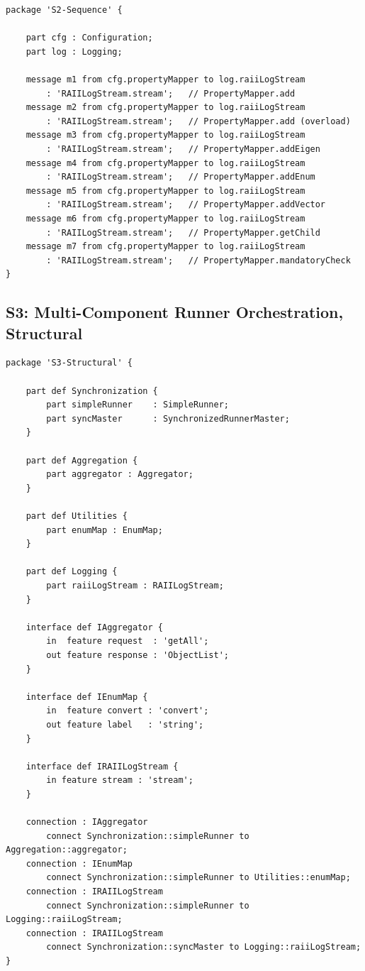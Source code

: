 \begin{verbatim}
package 'S2-Sequence' {

    part cfg : Configuration;
    part log : Logging;

    message m1 from cfg.propertyMapper to log.raiiLogStream
        : 'RAIILogStream.stream';   // PropertyMapper.add
    message m2 from cfg.propertyMapper to log.raiiLogStream
        : 'RAIILogStream.stream';   // PropertyMapper.add (overload)
    message m3 from cfg.propertyMapper to log.raiiLogStream
        : 'RAIILogStream.stream';   // PropertyMapper.addEigen
    message m4 from cfg.propertyMapper to log.raiiLogStream
        : 'RAIILogStream.stream';   // PropertyMapper.addEnum
    message m5 from cfg.propertyMapper to log.raiiLogStream
        : 'RAIILogStream.stream';   // PropertyMapper.addVector
    message m6 from cfg.propertyMapper to log.raiiLogStream
        : 'RAIILogStream.stream';   // PropertyMapper.getChild
    message m7 from cfg.propertyMapper to log.raiiLogStream
        : 'RAIILogStream.stream';   // PropertyMapper.mandatoryCheck
}
\end{verbatim}

\subsection{S3: Multi-Component Runner Orchestration, Structural}

\begin{verbatim}
package 'S3-Structural' {

    part def Synchronization {
        part simpleRunner    : SimpleRunner;
        part syncMaster      : SynchronizedRunnerMaster;
    }

    part def Aggregation {
        part aggregator : Aggregator;
    }

    part def Utilities {
        part enumMap : EnumMap;
    }

    part def Logging {
        part raiiLogStream : RAIILogStream;
    }

    interface def IAggregator {
        in  feature request  : 'getAll';
        out feature response : 'ObjectList';
    }

    interface def IEnumMap {
        in  feature convert : 'convert';
        out feature label   : 'string';
    }

    interface def IRAIILogStream {
        in feature stream : 'stream';
    }

    connection : IAggregator
        connect Synchronization::simpleRunner to Aggregation::aggregator;
    connection : IEnumMap
        connect Synchronization::simpleRunner to Utilities::enumMap;
    connection : IRAIILogStream
        connect Synchronization::simpleRunner to Logging::raiiLogStream;
    connection : IRAIILogStream
        connect Synchronization::syncMaster to Logging::raiiLogStream;
}
\end{verbatim}

